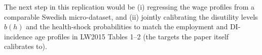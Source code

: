 The next step in this replication would be (i) regressing the wage profiles from a comparable Swedish micro-dataset, and (ii) jointly calibrating the disutility levels $b(h)$ and the health-shock probabilities to match the employment and DI-incidence age profiles in LW2015 Tables 1--2 (the targets the paper itself calibrates to).
